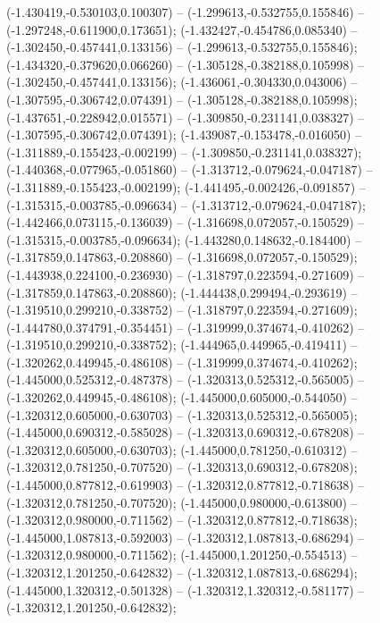  (-1.430419,-0.530103,0.100307) -- (-1.299613,-0.532755,0.155846) -- (-1.297248,-0.611900,0.173651);
 (-1.432427,-0.454786,0.085340) -- (-1.302450,-0.457441,0.133156) -- (-1.299613,-0.532755,0.155846);
 (-1.434320,-0.379620,0.066260) -- (-1.305128,-0.382188,0.105998) -- (-1.302450,-0.457441,0.133156);
 (-1.436061,-0.304330,0.043006) -- (-1.307595,-0.306742,0.074391) -- (-1.305128,-0.382188,0.105998);
 (-1.437651,-0.228942,0.015571) -- (-1.309850,-0.231141,0.038327) -- (-1.307595,-0.306742,0.074391);
 (-1.439087,-0.153478,-0.016050) -- (-1.311889,-0.155423,-0.002199) -- (-1.309850,-0.231141,0.038327);
 (-1.440368,-0.077965,-0.051860) -- (-1.313712,-0.079624,-0.047187) -- (-1.311889,-0.155423,-0.002199);
 (-1.441495,-0.002426,-0.091857) -- (-1.315315,-0.003785,-0.096634) -- (-1.313712,-0.079624,-0.047187);
 (-1.442466,0.073115,-0.136039) -- (-1.316698,0.072057,-0.150529) -- (-1.315315,-0.003785,-0.096634);
 (-1.443280,0.148632,-0.184400) -- (-1.317859,0.147863,-0.208860) -- (-1.316698,0.072057,-0.150529);
 (-1.443938,0.224100,-0.236930) -- (-1.318797,0.223594,-0.271609) -- (-1.317859,0.147863,-0.208860);
 (-1.444438,0.299494,-0.293619) -- (-1.319510,0.299210,-0.338752) -- (-1.318797,0.223594,-0.271609);
 (-1.444780,0.374791,-0.354451) -- (-1.319999,0.374674,-0.410262) -- (-1.319510,0.299210,-0.338752);
 (-1.444965,0.449965,-0.419411) -- (-1.320262,0.449945,-0.486108) -- (-1.319999,0.374674,-0.410262);
 (-1.445000,0.525312,-0.487378) -- (-1.320313,0.525312,-0.565005) -- (-1.320262,0.449945,-0.486108);
 (-1.445000,0.605000,-0.544050) -- (-1.320312,0.605000,-0.630703) -- (-1.320313,0.525312,-0.565005);
 (-1.445000,0.690312,-0.585028) -- (-1.320313,0.690312,-0.678208) -- (-1.320312,0.605000,-0.630703);
 (-1.445000,0.781250,-0.610312) -- (-1.320312,0.781250,-0.707520) -- (-1.320313,0.690312,-0.678208);
 (-1.445000,0.877812,-0.619903) -- (-1.320312,0.877812,-0.718638) -- (-1.320312,0.781250,-0.707520);
 (-1.445000,0.980000,-0.613800) -- (-1.320312,0.980000,-0.711562) -- (-1.320312,0.877812,-0.718638);
 (-1.445000,1.087813,-0.592003) -- (-1.320312,1.087813,-0.686294) -- (-1.320312,0.980000,-0.711562);
 (-1.445000,1.201250,-0.554513) -- (-1.320312,1.201250,-0.642832) -- (-1.320312,1.087813,-0.686294);
 (-1.445000,1.320312,-0.501328) -- (-1.320312,1.320312,-0.581177) -- (-1.320312,1.201250,-0.642832);
